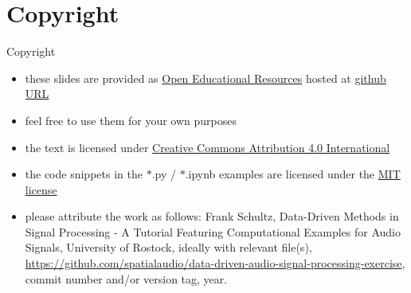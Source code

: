 \documentclass[mathserif, aspectratio=1610]{intbeamer}
\begin{document}
\section{Copyright}
\begin{frame}{Copyright}
\begin{itemize}
\item these slides are provided as \href{https://en.wikipedia.org/wiki/Open_educational_resources}{Open Educational Resources} hosted at \href{https://github.com/spatialaudio/data-driven-audio-signal-processing-exercise}{github URL}
\item feel free to use them for your own purposes
\item the text is licensed under \href{https://creativecommons.org/licenses/by/4.0/}{Creative Commons Attribution 4.0 International}
\item the code snippets in the $*$.py / $*$.ipynb examples are licensed under the \href{https://opensource.org/licenses/MIT}{MIT license}
\item please attribute the work as follows: Frank Schultz, Data-Driven Methods in Signal Processing - A Tutorial Featuring Computational Examples for Audio Signals, University of Rostock,  ideally with relevant file(s), \href{https://github.com/spatialaudio/data-driven-audio-signal-processing-exercise}{https://github.com/spatialaudio/data-driven-audio-signal-processing-exercise}, commit number and/or version tag, year.
\end{itemize}

\end{frame}
%
\end{document}
